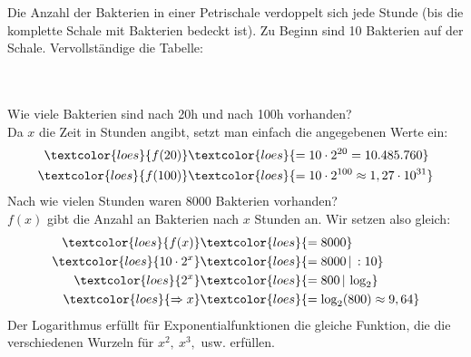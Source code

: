 Die Anzahl der Bakterien in einer Petrischale verdoppelt sich jede Stunde (bis die komplette Schale mit Bakterien bedeckt ist). Zu Beginn sind 10 Bakterien auf der Schale. Vervollständige die Tabelle:\\
\vspace{0.3cm}\\
\begin{minipage}{0.50\textwidth}
	\vspace{0.3cm}\\
	Wie viele Bakterien sind nach 20h und nach 100h vorhanden?\\
	\textcolor{loes}{Da \(x\) die Zeit in Stunden angibt, setzt man einfach die angegebenen Werte ein:}
	\begin{align*}
		\textcolor{loes}{f(20)}&\textcolor{loes}{=10\cdot 2^{20}=10.485.760}\\
		\textcolor{loes}{f(100)}&\textcolor{loes}{=10\cdot 2^{100}\approx 1,27\cdot 10^{31}}
	\end{align*}
	Nach wie vielen Stunden waren 8000 Bakterien vorhanden?\\
	\textcolor{loes}{\(f(x)\) gibt die Anzahl an Bakterien nach \(x\) Stunden an. Wir setzen also gleich:}
	\begin{align*}
		\textcolor{loes}{f(x)}&\textcolor{loes}{=8000}\\
		\textcolor{loes}{10\cdot 2^x}&\textcolor{loes}{=8000\,|\,:10}\\
		\textcolor{loes}{2^x}&\textcolor{loes}{=800\,|\,\log_2}\\
		\textcolor{loes}{\Rightarrow x}&\textcolor{loes}{=\log_2(800)\approx 9,64}
	\end{align*}
	\textcolor{loes}{Der Logarithmus erfüllt für Exponentialfunktionen die gleiche Funktion, die die verschiedenen Wurzeln für \(x^2,\ x^3,\) usw. erfüllen.}\\
\end{minipage}
